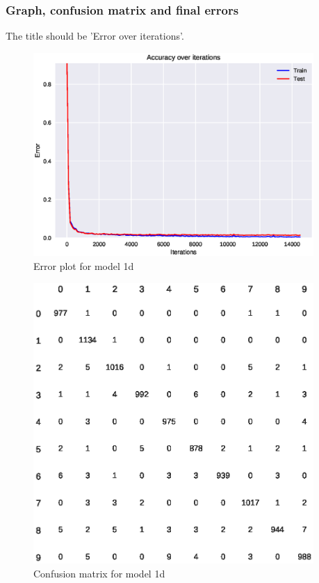 \documentclass{article}
\begin{document}
\subsubsection{Graph, confusion matrix and final errors}

The title should be 'Error over iterations'.

\begin{figure}[H]
  \centering
  \includegraphics[width=0.95\textwidth]{error_1d.eps}
  \caption{Error plot for model 1d}
  \label{fig:err_1d}
\end{figure}

\begin{figure}[H]
  \centering
  \includegraphics[width=0.95\textwidth]{confusion_matrix_1d.eps}
  \caption{Confusion matrix for model 1d}
  \label{fig:conf_1d}
\end{figure}
\end{document}

